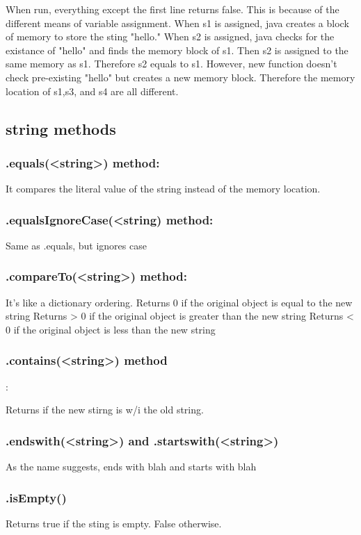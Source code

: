 \documentclass [12 pt, twoside] {article}
\begin{document}
When run, everything except the first line returns false.
This is because of the different means of variable assignment.
When s1 is assigned, java creates a block of memory to store the sting "hello."
When s2 is assigned, java checks for the existance of "hello" and finds the memory block of s1.
Then s2 is assigned to the same memory as s1.
Therefore s2 equals to s1.
However, new function doesn't check pre-existing "hello" but creates a new memory block.
Therefore the memory location of s1,s3, and s4 are all different.


\subsection{string methods}
\subsubsection{.equals(<string>) method:}


It compares the literal value of the string instead of the memory location.


\subsubsection{.equalsIgnoreCase(<string) method:}


Same as .equals, but ignores case


\subsubsection{.compareTo(<string>) method:}


It's like a dictionary ordering.
Returns 0 if the original object is equal to the new string
\newline
Returns > 0 if the original object is greater than the new string
\newline
Returns < 0 if the original object is less than the new string


\subsubsection{.contains(<string>) method}:


Returns if the new stirng is w/i the old string.


\subsubsection{.endswith(<string>) and .startswith(<string>)}


As the name suggests, ends with blah and starts with blah


\subsubsection{.isEmpty()}


Returns true if the sting is empty. False otherwise.
\end{document}
